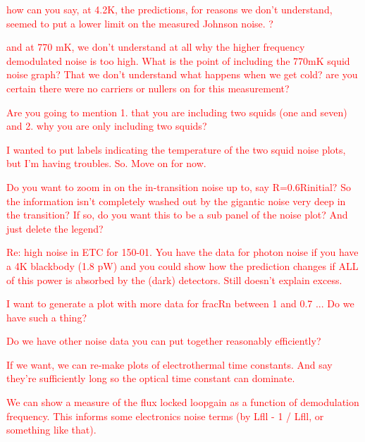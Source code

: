 \textcolor{red}{how can you say, at 4.2K, the predictions, for reasons we don't understand, seemed to put a lower limit on the measured Johnson noise. ?}

\textcolor{red}{and at 770 mK, we don't understand at all why the higher frequency demodulated noise is too high. What is the point of including the 770mK squid noise graph? That we don't understand what happens when we get cold? are you certain there were no carriers or nullers on for this measurement?}

\textcolor{red}{Are you going to mention 1. that you are including two squids (one and seven) and 2. why you are only including two squids?}

\textcolor{red}{I wanted to put labels indicating the temperature of the two squid noise plots, but I'm having troubles. So. Move on for now.}

\textcolor{red}{Do you want to zoom in on the in-transition noise up to, say R=0.6Rinitial? So the information isn't completely washed out by the gigantic noise very deep in the transition? If so, do you want this to be a sub panel of the noise plot? And just delete the legend?}

\textcolor{red}{Re: high noise in ETC for 150-01. You have the data for photon noise if you have a 4K blackbody (1.8 pW) and you could show how the prediction changes if ALL of this power is absorbed by the (dark) detectors. Still doesn't explain excess.}

\textcolor{red}{I want to generate a plot with more data for fracRn between 1 and 0.7 ... Do we have such a thing?}

\textcolor{red}{Do we have other noise data you can put together reasonably efficiently?}

\textcolor{red}{If we want, we can re-make plots of electrothermal time constants. And say they're sufficiently long so the optical time constant can dominate.}

\textcolor{red}{We can show a measure of the flux locked loopgain as a function of demodulation frequency. This informs some electronics noise terms (by Lfll - 1 / Lfll, or something like that).} 


